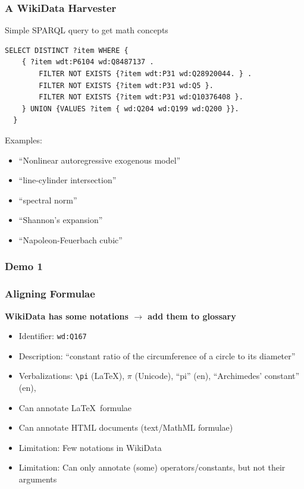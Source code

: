 \documentclass[aspectratio=169]{beamer}
\begin{document}
\begin{frame}[fragile]
    \frametitle{A WikiData Harvester}
    {\centering Simple SPARQL query to get math concepts\vspace{1em}\par}
    \begin{lstlisting}[language=SPARQL]
SELECT DISTINCT ?item WHERE {
    { ?item wdt:P6104 wd:Q8487137 .
        FILTER NOT EXISTS {?item wdt:P31 wd:Q28920044. } .
        FILTER NOT EXISTS {?item wdt:P31 wd:Q5 }.
        FILTER NOT EXISTS {?item wdt:P31 wd:Q10376408 }.
    } UNION {VALUES ?item { wd:Q204 wd:Q199 wd:Q200 }}. 
  }
    \end{lstlisting}
    \vspace{1em}\par
    Examples:
    \begin{itemize}
        \item ``Nonlinear autoregressive exogenous model''
        \item ``line-cylinder intersection''
        \item ``spectral norm''
        \item ``Shannon's expansion''
        \item ``Napoleon-Feuerbach cubic''
    \end{itemize}
\end{frame}

\begin{frame}
    \frametitle{Demo 1}
\end{frame}

\begin{frame}[fragile]
    \frametitle{Aligning Formulae}
    \textbf{WikiData has some notations $\to$ add them to glossary}
    \vspace{1em}\par
    \begin{itemize}
        \item Identifier: \texttt{wd:Q167}
        \item Description: ``constant ratio of the circumference of a circle to its diameter''
        \item Verbalizations: \verb.\pi. (\LaTeX), $\pi$ (Unicode), ``pi'' (en), ``Archimedes' constant'' (en), \textellipsis
    \end{itemize}
    \vspace{1em}\par
    \pause
    \begin{itemize}
        \item Can annotate \LaTeX\ formulae
        \item Can annotate HTML documents (text/MathML formulae)
        \item Limitation: Few notations in WikiData
        \item Limitation: Can only annotate (some) operators/constants, but not their arguments
    \end{itemize}
\end{frame}
\end{document}

